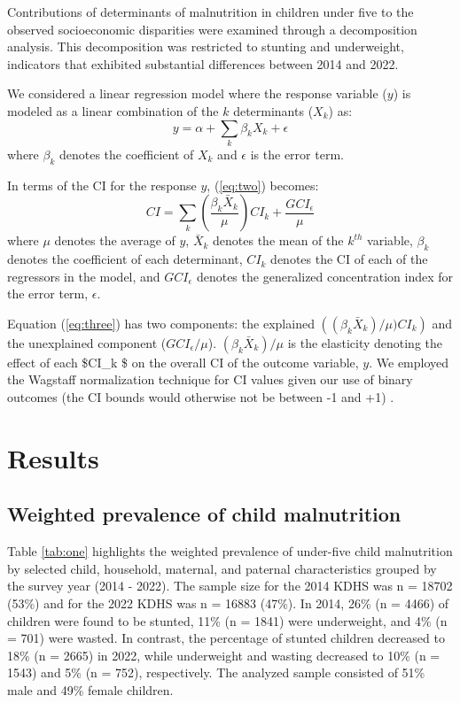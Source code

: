 \documentclass[sn-basic,Numbered,pdflatex]{sn-jnl}
\theoremstyle{remark}
\theoremstyle{definition}
\begin{document}
Contributions of determinants of malnutrition in children under five to
the observed socioeconomic disparities were examined through a
decomposition analysis. This decomposition was restricted to stunting
and underweight, indicators that exhibited substantial differences
between 2014 and 2022.

We considered a linear regression model where the response variable
(\(y\)) is modeled as a linear combination of the \(k\) determinants
(\(X_k\)) as: \begin{equation}
y = \alpha + \sum_{k} \beta_k X_k + \epsilon
\label{eq:two}
\end{equation} where \(\beta_k\) denotes the coefficient of \(X_k\) and
\(\epsilon\) is the error term.

In terms of the CI for the response \(y\), (\ref{eq:two}) becomes:
\begin{equation}
CI = \sum_{k} \left( \frac{\beta_k \bar{X}_k}{\mu} \right) CI_k + \frac{G CI_{\epsilon}}{\mu}
\label{eq:three}
\end{equation} where \(\mu\) denotes the average of \(y\), \(\bar{X}_k\)
denotes the mean of the \(k^{th}\) variable, \(\beta_k\) denotes the
coefficient of each determinant, \(CI_k\) denotes the CI of each of the
regressors in the model, and \(G CI_\epsilon\) denotes the generalized
concentration index for the error term, \(\epsilon\).

Equation (\ref{eq:three}) has two components: the explained
\(\left( (\beta_k \bar{X}_k)/ \mu)CI_k\right)\) and the unexplained
component (\(GCI_{\epsilon}/ \mu\)). \((\beta_k \bar{X}_k)/\mu\) is the
elasticity denoting the effect of each \$CI\_k \$ on the overall CI of
the outcome variable, \(y\). We employed the Wagstaff normalization
technique for CI values given our use of binary outcomes (the CI bounds
would otherwise not be between -1 and +1)
\citep{Wagstaff2000, Wagstaff2003}.

\hypertarget{sec2}{%
\section{Results}\label{sec2}}

\hypertarget{weighted-prevalence-of-child-malnutrition-1}{%
\subsection{Weighted prevalence of child
malnutrition}\label{weighted-prevalence-of-child-malnutrition-1}}

Table \ref{tab:one} highlights the weighted prevalence of under-five
child malnutrition by selected child, household, maternal, and paternal
characteristics grouped by the survey year (2014 - 2022). The sample
size for the 2014 KDHS was n = 18702 (53\%) and for the 2022 KDHS was n
= 16883 (47\%). In 2014, 26\% (n = 4466) of children were found to be
stunted, 11\% (n = 1841) were underweight, and 4\% (n = 701) were
wasted. In contrast, the percentage of stunted children decreased to
18\% (n = 2665) in 2022, while underweight and wasting decreased to 10\%
(n = 1543) and 5\% (n = 752), respectively. The analyzed sample
consisted of 51\% male and 49\% female children.
\end{document}
